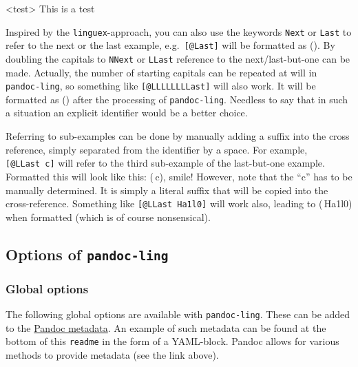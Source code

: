\documentclass[
]{article}
\begin{document}
\ex<test> 
  This is a test
\xe

Inspired by the \texttt{linguex}-approach, you can also use the keywords
\texttt{Next} or \texttt{Last} to refer to the next or the last example,
e.g.~\texttt{{[}@Last{]}} will be formatted as (). By
doubling the capitals to \texttt{NNext} or \texttt{LLast} reference to
the next/last-but-one can be made. Actually, the number of starting
capitals can be repeated at will in \texttt{pandoc-ling}, so something
like \texttt{{[}@LLLLLLLLast{]}} will also work. It will be formatted as
() after the processing of \texttt{pandoc-ling}.
Needless to say that in such a situation an explicit identifier would be
a better choice.

Referring to sub-examples can be done by manually adding a suffix into
the cross reference, simply separated from the identifier by a space.
For example, \texttt{{[}@LLast~c{]}} will refer to the third sub-example
of the last-but-one example. Formatted this will look like this:
(\,c), smile! However, note that the ``c'' has to
be manually determined. It is simply a literal suffix that will be
copied into the cross-reference. Something like
\texttt{{[}@LLast\ Ha1l0{]}} will work also, leading to
(\,Ha1l0) when formatted (which is of course
nonsensical).

\hypertarget{options-of-pandoc-ling}{%
\subsection{\texorpdfstring{Options of
\texttt{pandoc-ling}}{Options of pandoc-ling}}\label{options-of-pandoc-ling}}

\hypertarget{global-options}{%
\subsubsection{Global options}\label{global-options}}

The following global options are available with \texttt{pandoc-ling}.
These can be added to the
\href{https://pandoc.org/MANUAL.html\#metadata-blocks}{Pandoc metadata}.
An example of such metadata can be found at the bottom of this
\texttt{readme} in the form of a YAML-block. Pandoc allows for various
methods to provide metadata (see the link above).
\end{document}
